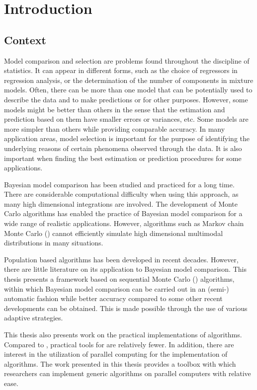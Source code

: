 \chapter{Introduction}
\label{cha:Introduction}

\section{Context}
\label{sec:Context}

Model comparison and selection are problems found throughout the discipline
of statistics. It can appear in different forms, such as the choice of
regressors in regression analysis, or the determination of the number of
components in mixture models. Often, there can be more than one model that
can be potentially used to describe the data and to make predictions or for
other purposes. However, some models might be better than others in the sense
that the estimation and prediction based on them have smaller errors or
variances, etc. Some models are more simpler than others while providing
comparable accuracy. In many application areas, model selection is important
for the purpose of identifying the underlying reasons of certain phenomena
observed through the data. It is also important when finding the best
estimation or prediction procedures for some applications.

Bayesian model comparison has been studied and practiced for a long time.
There are considerable computational difficulty when using this approach, as
many high dimensional integrations are involved. The development of Monte
Carlo algorithms has enabled the practice of Bayesian model comparison for a
wide range of realistic applications. However, algorithms such as Markov chain
Monte Carlo (\mcmc) cannot efficiently simulate high dimensional multimodal
distributions in many situations.

Population based algorithms has been developed in recent decades. However,
there are little literature on its application to Bayesian model comparison.
This thesis presents a framework based on sequential Monte Carlo (\smc)
algorithms, within which Bayesian model comparison can be carried out in an
(semi-) automatic fashion while better accuracy compared to some other recent
developments can be obtained. This is made possible through the use of
various adaptive strategies.

This thesis also presents work on the practical implementations of \smc
algorithms. Compared to \mcmc, practical tools for \smc are relatively fewer.
In addition, there are interest in the utilization of parallel computing for
the implementation of \smc algorithms. The work presented in this thesis
provides a toolbox with which researchers can implement generic \smc
algorithms on parallel computers with relative ease.

